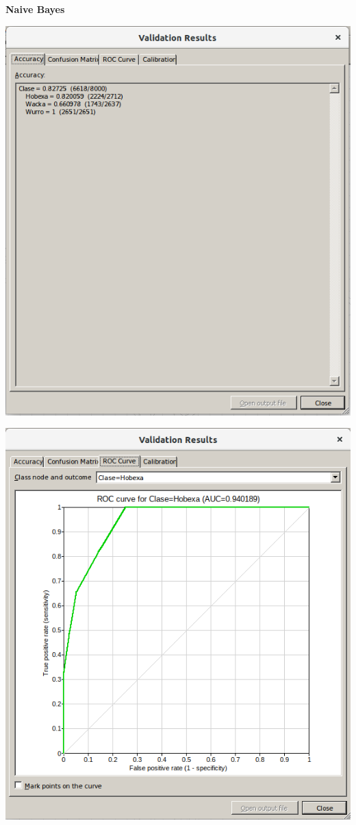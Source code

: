\documentclass{article}
\begin{document}
\newpage
\textbf{Naive Bayes}

\begin{center}
\includegraphics[scale=0.4]{images/4e.png}
\end{center}

\begin{center}
\includegraphics[scale=0.4]{images/4g.png}
\end{center}
\end{document}
